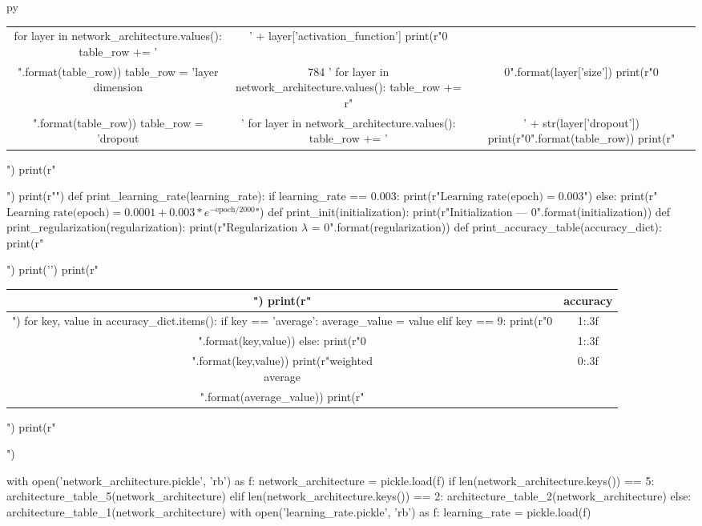 \documentclass[11pt]{article}
\begin{document}
\begin{pythontexcustomcode}{py}
\begin{table}[H]
\begin{tabular}{cc|c}
    for layer in network_architecture.values():
        table_row += ' & ' + layer['activation_function']
    print(r"{0} \\".format(table_row))
    table_row = 'layer dimension & \LARGE 784 '
    for layer in network_architecture.values():
        table_row += r"& \LARGE {0}".format(layer['size'])
    print(r"{0} \\".format(table_row))
    table_row = 'dropout & '
    for layer in network_architecture.values():
        table_row += '& ' + str(layer['dropout'])
    print(r"{0}".format(table_row))
    print(r"\end{tabular}")
    print(r"\end{table}")
    print(r"")
def print_learning_rate(learning_rate):
    if learning_rate == 0.003:
        print(r"$\textrm{Learning rate(epoch)} = 0.003$")
    else:
        print(r"$\textrm{Learning rate(epoch)} = 0.0001 + 0.003 * e^{- \textrm{epoch}/2000}$")
def print_init(initialization):
    print(r"Initialization --- {0}".format(initialization))
def print_regularization(regularization):
    print(r"Regularization $\lambda$ = {0}".format(regularization))
def print_accuracy_table(accuracy_dict):
    print(r"\begin{table}[H]")
    print('\centering')
    print(r"\begin{tabular}{c|c}")
    print(r" & accuracy \\ \hline")
    for key, value in accuracy_dict.items():
        if key == 'average':
            average_value = value
        elif key == 9:
            print(r"{0} & {1:.3f} \\ \hline".format(key,value))
        else:
            print(r"{0} & {1:.3f} \\".format(key,value))
    print(r"\makecell{{weighted \\ average}} & {0:.3f} \\".format(average_value))
    print(r"\end{tabular}")
    print(r"\end{table}")
\end{pythontexcustomcode}
\begin{pycode}
with open('network_architecture.pickle', 'rb') as f:
    network_architecture = pickle.load(f)
if len(network_architecture.keys()) == 5:
    architecture_table_5(network_architecture)
elif len(network_architecture.keys()) == 2:
    architecture_table_2(network_architecture)
else:
    architecture_table_1(network_architecture)
with open('learning_rate.pickle', 'rb') as f:
    learning_rate = pickle.load(f)
\end{pycode}
\end{document}
